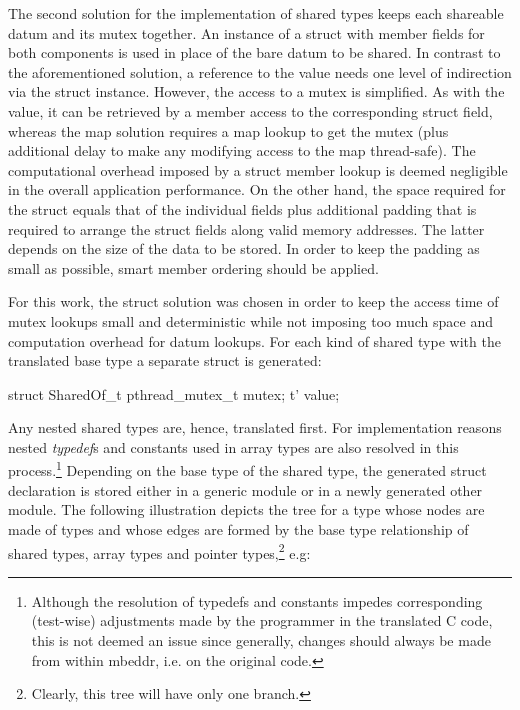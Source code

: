 The second solution for the implementation of shared types keeps each shareable datum and its mutex together. An instance of a struct with member fields for both components is used in place of the bare datum to be shared. In contrast to the aforementioned solution, a reference to the value  needs one level of indirection via the struct instance. However, the access to a mutex is simplified. As with the value, it can be retrieved by a member access to the corresponding struct field, whereas the map solution requires a map lookup to get the mutex (plus additional delay to make any modifying access to the map thread-safe). The computational overhead imposed by a struct member lookup is deemed negligible in the overall application performance. On the other hand, the space required for the struct equals that of the individual fields plus additional padding \cite[pp.~303 ff.]{LinuxSystemProgramming} that is required to arrange the struct fields along valid memory addresses. The latter depends on the size of the data to be stored. In order to keep the padding as small as possible, smart member ordering should be applied. 

For this work, the struct solution was chosen in order to keep the access time of mutex lookups small and deterministic while not imposing too much space and computation overhead for datum lookups. For each kind of shared type  with the translated base type  a separate struct is generated:
\begin{ccode}
struct SharedOf_t {
  pthread_mutex_t mutex;
  t' value;
}
\end{ccode}
Any nested shared types are, hence, translated first. For implementation reasons nested \textit{typedef}s and constants used in array types are also resolved in this process.\footnote{Although the resolution of typedefs and constants impedes corresponding (test-wise) adjustments made by the programmer in the translated C code, this is not deemed an issue since generally, changes should always be made from within mbeddr, i.e. on the original code.} Depending on the base type of the shared type, the generated struct declaration is stored either in a generic module or in a newly generated other module. The following illustration depicts the tree for a type  whose nodes are made of types and whose edges are formed by the base type relationship of shared types, array types and pointer types,\footnote{Clearly, this tree will have only one branch.} e.g: 


